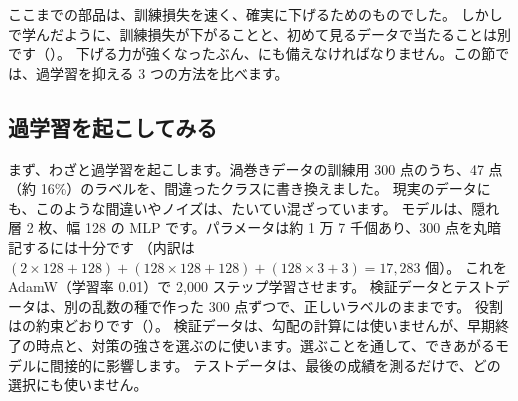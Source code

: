 ここまでの部品は、訓練損失を速く、確実に下げるためのものでした。
しかしで学んだように、訓練損失が下がることと、初めて見るデータで当たることは別です（）。
下げる力が強くなったぶん、にも備えなければなりません。この節では、過学習を抑える 3 つの方法を比べます。

\subsection*{過学習を起こしてみる}

まず、わざと過学習を起こします。渦巻きデータの訓練用 300 点のうち、47 点（約 16\%）のラベルを、間違ったクラスに書き換えました。
現実のデータにも、このような間違いやノイズは、たいてい混ざっています。
モデルは、隠れ層 2 枚、幅 128 の MLP です。パラメータは約 1 万 7 千個あり、300 点を丸暗記するには十分です
（内訳は $(2\times128+128)+(128\times128+128)+(128\times3+3)=17{,}283$ 個）。
これを AdamW（学習率 0.01）で 2,000 ステップ学習させます。
検証データとテストデータは、別の乱数の種で作った 300 点ずつで、正しいラベルのままです。
役割はの約束どおりです（）。
検証データは、勾配の計算には使いませんが、早期終了の時点と、対策の強さを選ぶのに使います。選ぶことを通して、できあがるモデルに間接的に影響します。
テストデータは、最後の成績を測るだけで、どの選択にも使いません。

